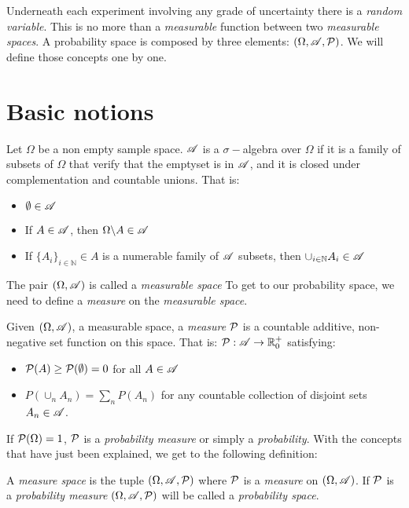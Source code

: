 

Underneath each experiment involving any grade of uncertainty there is a \emph{random variable}. This is no more than a \emph{measurable} function between two \emph{measurable spaces}.
A probability space is composed by three elements: $(\Omega, \mathscr{A}, \mathcal{P})$. We will define those concepts one by one.

\section{Basic notions}

\begin{ndef}Let $\Omega$ be a non empty sample space. $\mathscr{A}$ is a $\sigma-$algebra over $\Omega$ if it is a family of subsets of $\Omega$ that verify that the emptyset is in $\mathscr{A}$, and it is closed under complementation and countable unions. That is:
\begin{itemize}
  \item $\emptyset \in \mathscr{A}$
  \item If $A \in \mathscr{A}$, then $\Omega \backslash A \in \mathscr{A}$
  \item If $\{A_i\}_{i \in \mathbb N} \in A$ is a numerable family of $\mathscr{A}$ subsets, then $\cup_{i \in \mathbb N} A_i \in \mathscr{A}$
\end{itemize}
\end{ndef}


The pair $(\Omega,\mathscr{A})$ is called a \emph{measurable space} To get to our probability space, we need to define a \emph{measure} on the \emph{measurable space}.

\begin{ndef}
Given $(\Omega,\mathscr{A})$, a measurable space, a \emph{measure} $\mathcal{P}$ is a countable additive, non-negative set function on this space. That is: $\mathcal{P}: \mathscr{A} \to \mathbb R_0^+$ satisfying:
\begin{itemize}
  \item $\mathcal{P}(A) \geq \mathcal{P}(\emptyset) = 0$ for all $A \in \mathscr{A}$
  \item $P(\cup_n A_n) = \sum_n P(A_n)$ for any countable collection of disjoint sets $A_n \in \mathscr{A}$.
\end{itemize}
\end{ndef}

If $\mathcal{P}(\Omega) = 1$, $\mathcal{P}$ is a \emph{probability measure} or simply a \emph{probability}. With the concepts that have just been explained, we get to the following definition:

\begin{ndef}
A \emph{measure space} is the tuple $(\Omega, \mathscr{A},\mathcal{P})$ where $\mathcal{P}$ is a \emph{measure} on $(\Omega, \mathscr{A})$. If $\mathcal{P}$ is a \emph{probability measure} $(\Omega,\mathscr{A},\mathcal{P})$ will be called a \emph{probability space}.
\end{ndef}

